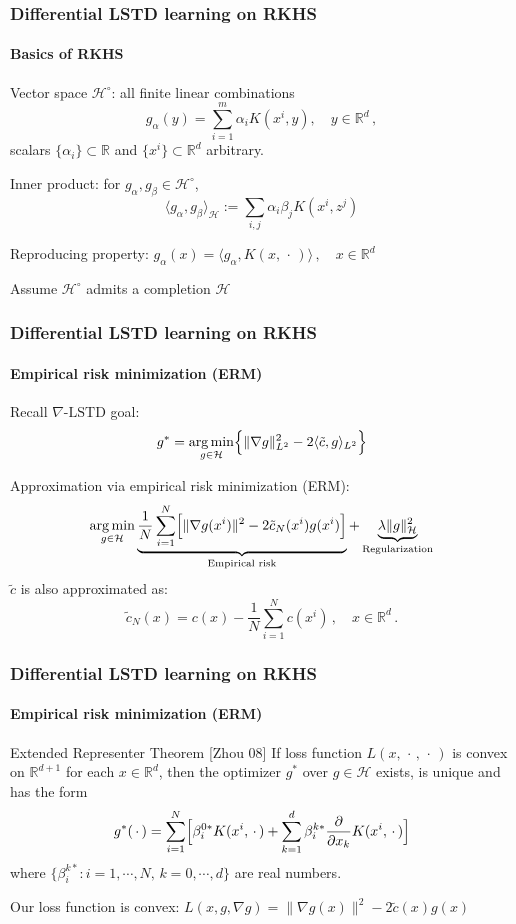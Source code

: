 \documentclass[xcolor=dvipsnames, subsection=false]{beamer}
\def\alertb#1{\alert{\color{BrickRed}  #1}}
\def\alertb#1{\alert{\color{BrickRed}  #1}}
\def\clH{{\mathcal H}}
\def\tilc{\tilde c}
\newcommand{\field}[1]{\mathbb{#1}}
\def\Re{\field{R}}
\def\varble{\,\cdot\,}
\def\argmin{\mathop{\rm arg\, min}}
\def\eqdef{\mathbin{:=}}
\def\gradTD{\nabla\text{-LSTD}}
\def\bl#1{{\color{blue}#1}}
\begin{document}
\begin{frame}
\frametitle{Differential LSTD learning on RKHS}
\framesubtitle{Basics of RKHS}
\begin{minipage}[t][6.5cm][t]{\textwidth}
	\alertb{Vector space $\clH^\circ$:}     all finite linear combinations
	\[
	 g_\alpha(y)  =\sum_{i=1}^m  \alpha_i K(x^i, y),  \quad y\in\Re^d \,,
	\]
	\hfill   scalars $\{\alpha_i\}  \subset \Re $ and   $\{x^i\} \subset\Re^d$   arbitrary.
	\smallskip
	
	\alertb{Inner product:} for $g_\alpha , g_\beta \in \clH^\circ$,
	\[
	\langle g_\alpha , g_\beta\rangle_\clH \eqdef \sum_{i,j}\alpha_i \beta_j K(x^i, z^j)
	\]
	
	\smallskip
	
	\alertb{Reproducing property:} $	g_\alpha(x)  = \langle g_\alpha , K(x,\varble) \rangle\,, \quad x\in \Re^d $
	\vfill
	\centerline{Assume $\clH^\circ$ admits a completion $\clH$}
\end{minipage}
\end{frame}

\begin{frame}
\frametitle{Differential LSTD learning on RKHS}
\framesubtitle{Empirical risk minimization (ERM)}

\begin{minipage}[t][6.5cm][t]{\textwidth}
	
	Recall $\gradTD$ goal:
	\[
	g^* = \argmin_{g\in \clH}   \Bigl\{   \|\nabla g  \|_{L^2}^2   -  2 \langle  \tilc,   g \rangle_{L^2}   \Bigr\}
	\]
	
	Approximation via \alertb{empirical risk minimization (ERM)}:
	\[
	\argmin_{g \in \clH} \underbrace{\frac{1}{N} \sum_{i=1}^N\Bigl[ \| \nabla g(x^i) \|^2 - 2 \tilc_N(x^i)g(x^i)\Bigr]}_{\text{Empirical risk}} + \underbrace{\lambda \|g\|_\clH^2}_{\text{Regularization}}
	\]
 $\tilc$ is also approximated as:\\[-1em]
	\[
	\tilc_N(x) = c(x) - \frac{1}{N}  \sum_{i=1}^N  c(x^i)\,,\quad x\in\Re^d\, .
	\]
\end{minipage}
\end{frame}

\begin{frame}
\frametitle{Differential LSTD learning on RKHS}
\framesubtitle{Empirical risk minimization (ERM)}
\begin{block}{Extended Representer Theorem \bl{[Zhou 08]}}
	If loss function
	$L(x,\varble,\varble)$ is convex   on $\Re^{d+1}$ for each $x\in\Re^d$, then the  optimizer $g^*$ over $g\in\clH$ exists, is unique and has the form
	\[
	g^*(\varble) = \sum_{i=1}^N  \Bigl[
	\beta_i^{0*}  K(x^i, \varble)   +  \sum_{k =1}^d  \beta_i^{k*} \frac{\partial}{\partial x_k}  K(x^i, \varble) \Bigr]
	\]
	where $\{\beta_i^{k*} \colon i=1,\cdots,N,\, k = 0,\cdots,d\}$ are real numbers.
\end{block}
\vfill
\pause
\centering
Our loss function is convex:   $L(x,g,\nabla g) = \| \nabla g(x)\|^2 - 2 \tilc(x) g(x)$
\end{frame}
\end{document}
